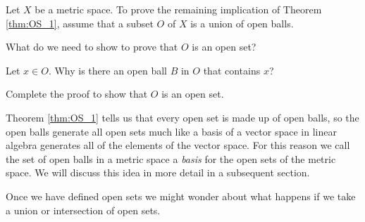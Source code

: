 \begin{activity} Let $X$ be a metric space. To prove the remaining implication of Theorem \ref{thm:OS_1}, assume that a subset $O$ of $X$ is a union of open balls. 
\ba
\item What do we need to show to prove that $O$ is an open set?

\item Let $x \in O$. Why is there an open ball $B$ in $O$ that contains $x$?

\item Complete the proof to show that $O$ is an open set.

\ea

\end{activity}

\begin{comment}

\ActivitySolution
\ba
\item We need to show that $O$ is a neighborhood of each of its points. 

\item Let $x \in O$. Since $O$ is a union of open balls, there must be an open ball $B$ in $O$ that contains $x$.  

\item Since every ball is a neighborhood of each of its points, there exists $\epsilon > 0$ such that $B(x, \epsilon) \subseteq B \subseteq O$. Thus, $O$ is a neighborhood of each of its points and is therefore an open set.

\ea

\end{comment}

Theorem \ref{thm:OS_1} tells us that every open set is made up of open balls, so the open balls generate all open sets much like a basis of a vector space in linear algebra generates all of the elements of the vector space. For this reason we call the set of open balls in a metric space a \emph{basis} for the open sets of the metric space. We will discuss this idea in more detail in a subsequent section.

\label{sec_union_int_open_sets}

Once we have defined open sets we might wonder about what happens if we take a union or intersection of open sets. 


